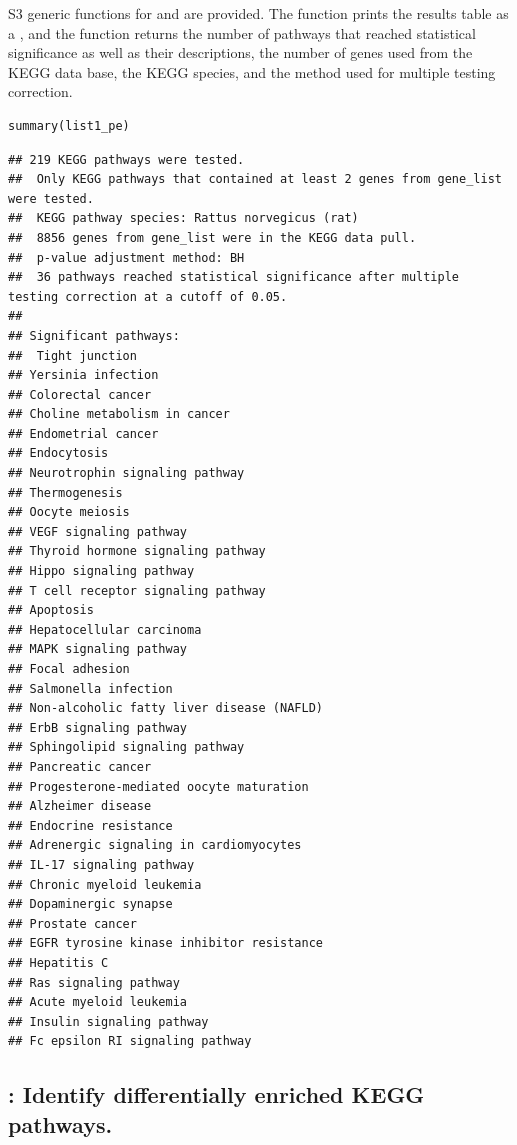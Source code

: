 \documentclass[article]{jss}\usepackage[]{graphicx}\usepackage[]{color}
\makeatletter
\newenvironment{kframe}{%
 \def\at@end@of@kframe{}%
 \ifinner\ifhmode%
  \def\at@end@of@kframe{\end{minipage}}%
  \begin{minipage}{\columnwidth}%
 \fi\fi%
 \def\FrameCommand##1{\hskip\@totalleftmargin \hskip-\fboxsep
 \colorbox{shadecolor}{##1}\hskip-\fboxsep
     \hskip-\linewidth \hskip-\@totalleftmargin \hskip\columnwidth}%
 \MakeFramed {\advance\hsize-\width
   \@totalleftmargin\z@ \linewidth\hsize
   \@setminipage}}%
 {\par\unskip\endMakeFramed%
 \at@end@of@kframe}
\newenvironment{knitrout}{}{} %
\makeatother
\begin{document}
S3 generic functions for  and  are provided.
The  function prints the results table as a , and the
 function returns the number of pathways that reached statistical
significance as well as their descriptions, the number of genes used from the
KEGG data base, the KEGG species, and the method used for multiple testing
correction.

\begin{knitrout}
\color{fgcolor}\begin{kframe}
\begin{lstlisting}[basicstyle=\ttfamily,breaklines=true]
summary(list1_pe)\end{lstlisting}
\begin{lstlisting}[basicstyle=\ttfamily,breaklines=true]
## 219 KEGG pathways were tested. 
##  Only KEGG pathways that contained at least 2 genes from gene_list were tested. 
##  KEGG pathway species: Rattus norvegicus (rat)
##  8856 genes from gene_list were in the KEGG data pull. 
##  p-value adjustment method: BH
##  36 pathways reached statistical significance after multiple testing correction at a cutoff of 0.05. 
##  
## Significant pathways: 
##  Tight junction
## Yersinia infection
## Colorectal cancer
## Choline metabolism in cancer
## Endometrial cancer
## Endocytosis
## Neurotrophin signaling pathway
## Thermogenesis
## Oocyte meiosis
## VEGF signaling pathway
## Thyroid hormone signaling pathway
## Hippo signaling pathway
## T cell receptor signaling pathway
## Apoptosis
## Hepatocellular carcinoma
## MAPK signaling pathway
## Focal adhesion
## Salmonella infection
## Non-alcoholic fatty liver disease (NAFLD)
## ErbB signaling pathway
## Sphingolipid signaling pathway
## Pancreatic cancer
## Progesterone-mediated oocyte maturation
## Alzheimer disease
## Endocrine resistance
## Adrenergic signaling in cardiomyocytes
## IL-17 signaling pathway
## Chronic myeloid leukemia
## Dopaminergic synapse
## Prostate cancer
## EGFR tyrosine kinase inhibitor resistance
## Hepatitis C
## Ras signaling pathway
## Acute myeloid leukemia
## Insulin signaling pathway
## Fc epsilon RI signaling pathway
\end{lstlisting}
\end{kframe}
\end{knitrout}

\subsection{: Identify differentially enriched KEGG pathways.}
\end{document}
